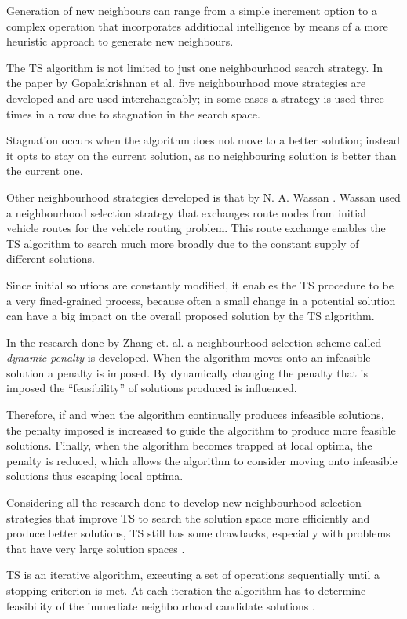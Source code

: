 Generation of new neighbours can range from a simple increment option to a complex operation that incorporates additional intelligence by means of a more heuristic approach to generate new neighbours.

The TS algorithm is not limited to just one neighbourhood search strategy. In the paper by Gopalakrishnan et al.\cite{TabuCarryOver} five neighbourhood move strategies are developed and are used interchangeably; in some cases a strategy is used three times in a row due to stagnation in the search space. 

Stagnation occurs when the algorithm does not move to a better solution; instead it opts to stay on the current solution, as no neighbouring solution is better than the current one. 

Other neighbourhood strategies developed is that by N. A. Wassan \cite{ReactiveTabuVHR}. Wassan used a neighbourhood selection strategy that exchanges route nodes from initial vehicle routes for the vehicle routing problem. This route exchange enables the TS algorithm to search much more broadly due to the constant supply of different solutions. 

Since initial solutions are constantly modified, it enables the TS procedure to be a very fined-grained process, because often a small change in a potential solution can have a big impact on the overall proposed solution by the TS algorithm.

In the research done by Zhang et. al.\cite{TSHazardous} a neighbourhood selection scheme called \emph{dynamic penalty} is developed. When the algorithm moves onto an infeasible solution a penalty is imposed. By dynamically changing the penalty that is imposed the ``feasibility'' of solutions produced is influenced. 

Therefore, if and when the algorithm continually produces infeasible solutions, the penalty imposed is increased to guide the algorithm to produce more feasible solutions. Finally, when the algorithm becomes trapped at local optima, the penalty is reduced, which allows the algorithm to consider moving onto infeasible solutions thus escaping local optima.

Considering all the research done to develop new neighbourhood selection strategies that improve TS to search the solution space more efficiently and produce better solutions, TS still has some drawbacks, especially with problems that have very large solution spaces \cite{EvoParallelTabu}.

TS is an iterative algorithm, executing a set of operations sequentially until a stopping criterion is met\cite{EvoParallelTabu,TabuVechicleRoutingWithTimeWindows}. At each iteration the algorithm has to determine feasibility of the immediate neighbourhood candidate solutions \cite{EvoParallelTabu,TabuVechicleRoutingWithTimeWindows}. 

